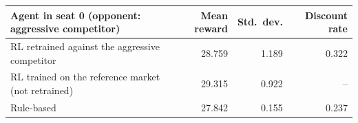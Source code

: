 \begin{tabular}{lrrr}
\toprule
Agent in seat 0 (opponent: aggressive competitor) & Mean reward & Std.\ dev. & Discount rate \\
\midrule
RL retrained against the aggressive competitor & 28.759 & 1.189 & 0.322 \\
RL trained on the reference market (not retrained) & 29.315 & 0.922 & -- \\
Rule-based & 27.842 & 0.155 & 0.237 \\
\bottomrule
\end{tabular}

